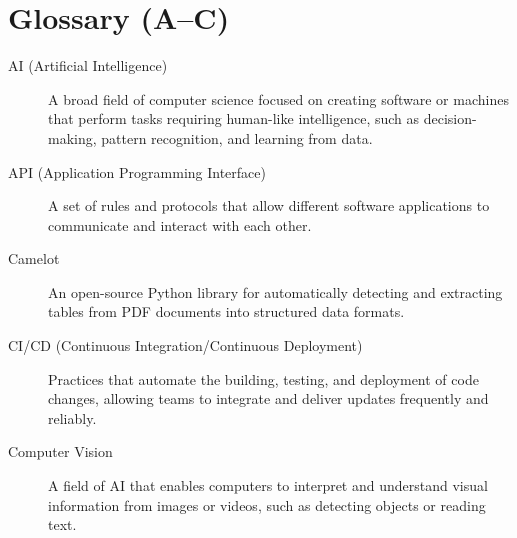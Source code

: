 \section*{Glossary (A–C)}
\begin{description}
  \item[AI (Artificial Intelligence)] 
    A broad field of computer science focused on creating software or machines that 
    perform tasks requiring human-like intelligence, such as decision-making, 
    pattern recognition, and learning from data.
  \item[API (Application Programming Interface)] 
    A set of rules and protocols that allow different software applications to 
    communicate and interact with each other.
  \item[Camelot] 
    An open-source Python library for automatically detecting and extracting 
    tables from PDF documents into structured data formats.
  \item[CI/CD (Continuous Integration/Continuous Deployment)] 
    Practices that automate the building, testing, and deployment of code changes, 
    allowing teams to integrate and deliver updates frequently and reliably.
  \item[Computer Vision] 
    A field of AI that enables computers to interpret and understand visual  
    information from images or videos, such as detecting objects or reading text.
\end{description}
